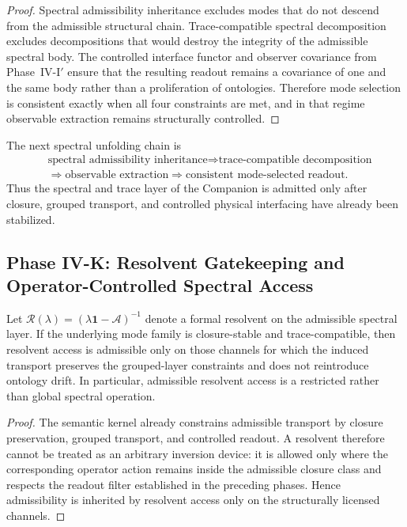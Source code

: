\begin{proof}
Spectral admissibility inheritance excludes modes that do not descend from the admissible structural chain. Trace-compatible spectral decomposition excludes decompositions that would destroy the integrity of the admissible spectral body. The controlled interface functor and observer covariance from Phase~IV-I$'$ ensure that the resulting readout remains a covariance of one and the same body rather than a proliferation of ontologies. Therefore mode selection is consistent exactly when all four constraints are met, and in that regime observable extraction remains structurally controlled.
\end{proof}

\begin{corollary}
\label{cor:spectral-readout-reconstruction-chain}
The next spectral unfolding chain is
\[
\begin{aligned}
&\text{spectral admissibility inheritance}
\Longrightarrow
\text{trace-compatible decomposition}\\
&\Longrightarrow
\text{observable extraction}
\Longrightarrow
\text{consistent mode-selected readout}.
\end{aligned}
\]
Thus the spectral and trace layer of the Companion is admitted only after closure, grouped transport, and controlled physical interfacing have already been stabilized.
\end{corollary}




\subsection*{Phase IV-K: Resolvent Gatekeeping and Operator-Controlled Spectral Access}

\begin{lemma}\label{lem:resolvent_admissibility}
Let $\mathcal R(\lambda)=(\lambda\mathbf 1-\mathcal A)^{-1}$ denote a formal resolvent on the admissible spectral layer. If the underlying mode family is closure-stable and trace-compatible, then resolvent access is admissible only on those channels for which the induced transport preserves the grouped-layer constraints and does not reintroduce ontology drift. In particular, admissible resolvent access is a restricted rather than global spectral operation.
\end{lemma}
\begin{proof}
The semantic kernel already constrains admissible transport by closure preservation, grouped transport, and controlled readout. A resolvent therefore cannot be treated as an arbitrary inversion device: it is allowed only where the corresponding operator action remains inside the admissible closure class and respects the readout filter established in the preceding phases. Hence admissibility is inherited by resolvent access only on the structurally licensed channels.
\end{proof}

